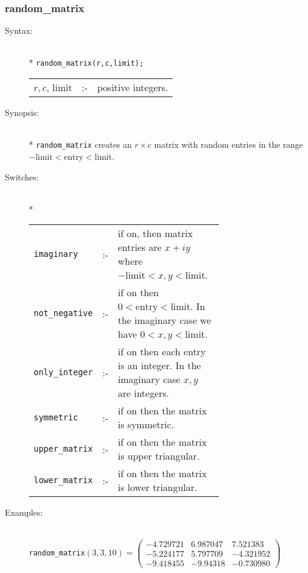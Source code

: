 \subsubsection{random\_matrix}
\label{linalg:random_matrix}
\hypertarget{operator:RANDOM_MATRIX}{}

\begin{description}
\item[Syntax:]\mbox{}\\*
\texttt{random\_matrix(r,c,limit);}\\[2mm]
\begin{tabular}{l l l}
$r,c$, limit &:-& positive integers. \\
\end{tabular}

\item[Synopsis:]\mbox{}\\*
\texttt{random\_matrix} creates an $r\times c$ matrix with random entries in the
range $-\text{limit} < \text{entry} < \text{limit}$.

\hypertarget{switch:IMAGINARY}{}
\hypertarget{switch:NOT_NEGATIVE}{}
\hypertarget{switch:ONLY_INTEGER}{}
\hypertarget{switch:SYMMETRIC}{}
\hypertarget{switch:LOWER_MATRIX}{}
\hypertarget{switch:UPPER_MATRIX}{}
\item[Switches:]\mbox{}\\*
\begin{tabular}{l l p{0.685\linewidth}}
\texttt{imaginary}  &:-& if
on, then matrix entries are $x+iy$ where $-\text{limit} < x,y < \text{limit}$.\\
\texttt{not\_negative} &:-& if on then $0 <
\text{entry} < \text{limit}$. In the imaginary case we have $0<x,y<\text{limit}$.\\
\texttt{only\_integer} &:-& if on then each
entry is an integer. In the imaginary case $x,y$ are integers.\\
\texttt{symmetric} &:-& if on then the matrix is symmetric. \\
\texttt{upper\_matrix} &:-& if on then the
matrix is upper triangular. \\
\texttt{lower\_matrix} &:-& if on then the matrix is lower triangular.
\end{tabular}

\item[Examples:]\mbox{}\\
  \texttt{random\_matrix}\((3,3,10) =
  \begin{pmatrix} -4.729721 & 6.987047 & 7.521383 \\
    - 5.224177 & 5.797709 & - 4.321952 \\
    - 9.418455 & - 9.94318 & - 0.730980
  \end{pmatrix}\)


\end{description}
